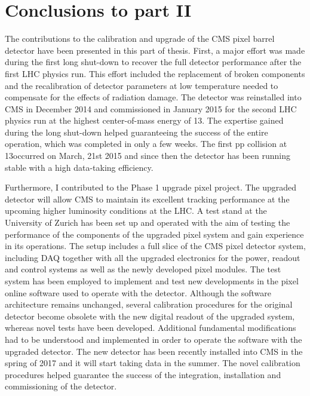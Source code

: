 \chapter{Conclusions to part II}
\label{ch:summary2}

The contributions to the calibration and upgrade of the CMS pixel barrel detector have been presented in this part of thesis.
First, a major effort was made during the first long shut-down to recover the full detector performance after the first LHC physics run.
This effort included the replacement of broken components and the recalibration of detector parameters at low temperature needed to compensate for the effects of radiation damage.
The detector was reinstalled into CMS in December 2014 and commissioned in January 2015 for the second LHC physics run at the highest center-of-mass energy of 13\TeV.
The expertise gained during the long shut-down helped guaranteeing the success of the entire operation, which was completed in only a few weeks.
The first pp collision at 13\TeV occurred on March, 21st 2015 and since then the detector
has been running stable with a high data-taking efficiency.

Furthermore, I contributed to the Phase 1 upgrade pixel project.
The upgraded detector will allow CMS to maintain its excellent tracking performance at the upcoming higher luminosity conditions at the LHC.
A test stand at the University of Zurich has been set up and operated with the aim of testing the performance of the components of the upgraded pixel system and gain experience in its operations. The setup includes a full slice of the CMS pixel detector system, including DAQ together with all the upgraded electronics for the power, readout and control systems as well as the newly developed pixel modules.
The test system has been employed to implement and test new developments in the pixel online software used to operate with the detector.
Although the software architecture remains unchanged, several calibration procedures for the original detector become obsolete with the new digital readout of the upgraded system,
whereas novel tests have been developed. 
Additional fundamental modifications had to be understood and implemented in order to operate the software with the upgraded detector.
The new detector has been recently installed into CMS in the spring of 2017 and it will start taking data in the summer.
The novel calibration procedures helped guarantee the success of the integration, installation and commissioning of the detector.